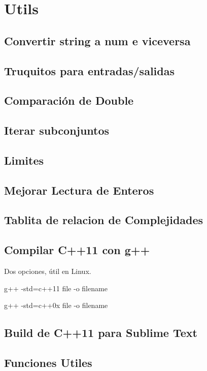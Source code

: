 \newpage
\section{Utils}
\subsection{Convertir string a num e viceversa}

\subsection{Truquitos para entradas/salidas}

\subsection{Comparaci\'on de Double}

\subsection{Iterar subconjuntos}

\subsection{Limites}

\subsection{Mejorar Lectura de Enteros}

\subsection{Tablita de relacion de Complejidades}

\subsection{Compilar C++11 con g++}
Dos opciones, \'util en Linux.
\begin{code}
g++ -std=c++11 {file} -o {filename}

g++ -std=c++0x {file} -o {filename}
\end{code}
\subsection{Build de C++11 para Sublime Text}

\subsection{Funciones Utiles}

